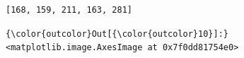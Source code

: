 \documentclass[11pt]{article}
\begin{document}
    \begin{Verbatim}[commandchars=\\\{\}]
[168, 159, 211, 163, 281]

    \end{Verbatim}

\begin{Verbatim}[commandchars=\\\{\}]
{\color{outcolor}Out[{\color{outcolor}10}]:} <matplotlib.image.AxesImage at 0x7f0dd81754e0>
\end{Verbatim}
            
    \begin{center}
    \end{center}
    { \hspace*{\fill} \\}
    
\end{document}
